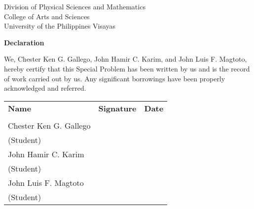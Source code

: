 \begin{center}
	Division of Physical Sciences and Mathematics\\
	College of Arts and Sciences\\
	University of the Philippines Visayas 
	
		\textbf{Declaration}
		\end{center}

We,  Chester Ken G. Gallego, John Hamir C. Karim, and John Luis F. Magtoto, hereby certify that this Special Problem has been written by us  and is the record of work carried out by us. Any significant borrowings have been properly acknowledged and referred.

	\begin{tabular}{lll}
	\bfseries Name  & \bfseries Signature & \bfseries Date\\ \\
	Chester Ken G. Gallego &\signaturerule  & \signaturerule\\ 
	\multicolumn{1}{l}{(Student)} \\ 
	John Hamir C. Karim &\signaturerule  & \signaturerule\\ 
	\multicolumn{1}{l}{(Student)} \\
	John Luis F. Magtoto &\signaturerule  & \signaturerule\\ 
\multicolumn{1}{l}{(Student)} \\

\end{tabular}



